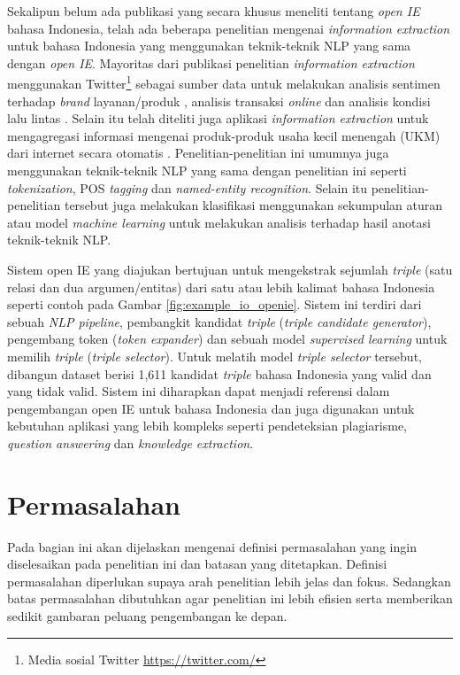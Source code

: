 Sekalipun belum ada publikasi yang secara khusus meneliti tentang \textit{open IE} bahasa Indonesia, telah ada beberapa penelitian mengenai \textit{information extraction} untuk bahasa Indonesia yang menggunakan teknik-teknik NLP yang sama dengan \textit{open IE}. Mayoritas dari publikasi penelitian \textit{information extraction} menggunakan Twitter\footnote{Media sosial Twitter \url{https://twitter.com/}} sebagai sumber data untuk melakukan analisis sentimen terhadap \textit{brand} layanan/produk \citep{vidya2015twitter}, analisis transaksi \textit{online} \citep{khodra2013ekstraksi} dan analisis kondisi lalu lintas \citep{hanifah2014twitter, endarnoto2011traffic}. Selain itu telah diteliti juga aplikasi \textit{information extraction} untuk mengagregasi informasi mengenai produk-produk usaha kecil menengah (UKM) dari internet secara otomatis \citep{oktavino2014information}. Penelitian-penelitian ini umumnya juga menggunakan teknik-teknik NLP yang sama dengan penelitian ini seperti \textit{tokenization}, POS \textit{tagging} dan \textit{named-entity recognition}. Selain itu penelitian-penelitian tersebut juga melakukan klasifikasi menggunakan sekumpulan aturan \citep{endarnoto2011traffic} atau model \textit{machine learning} \citep{oktavino2014information, vidya2015twitter, khodra2013ekstraksi} untuk melakukan analisis terhadap hasil anotasi teknik-teknik NLP.

Sistem open IE yang diajukan bertujuan untuk mengekstrak sejumlah \textit{triple} (satu relasi dan dua argumen/entitas) dari satu atau lebih kalimat bahasa Indonesia seperti contoh pada Gambar \ref{fig:example_io_openie}. Sistem ini terdiri dari sebuah \textit{NLP pipeline}, pembangkit kandidat \textit{triple} (\textit{triple candidate generator}), pengembang token (\textit{token expander}) dan sebuah model \textit{supervised learning} untuk memilih \textit{triple} (\textit{triple selector}). Untuk melatih model \textit{triple selector} tersebut, dibangun dataset berisi 1,611 kandidat \textit{triple} bahasa Indonesia yang valid dan yang tidak valid. Sistem ini diharapkan dapat menjadi referensi dalam pengembangan open IE untuk bahasa Indonesia dan juga digunakan untuk kebutuhan aplikasi yang lebih kompleks seperti pendeteksian plagiarisme, \textit{question answering} dan \textit{knowledge extraction}.

\section{Permasalahan}
Pada bagian ini akan dijelaskan mengenai definisi permasalahan yang ingin diselesaikan pada penelitian ini dan batasan yang ditetapkan. Definisi permasalahan diperlukan supaya arah penelitian lebih jelas dan fokus. Sedangkan batas permasalahan dibutuhkan agar penelitian ini lebih efisien serta memberikan sedikit gambaran peluang pengembangan ke depan.

